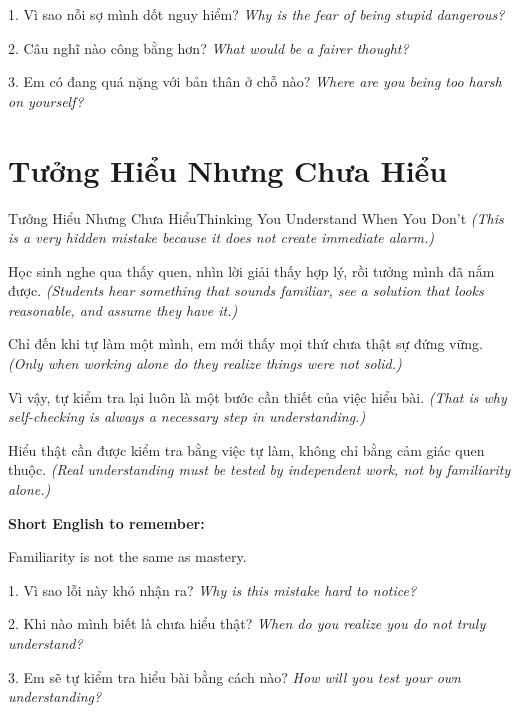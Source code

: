 \begin{tuhocnhanh}
1. Vì sao nỗi sợ mình dốt nguy hiểm? \textit{Why is the fear of being stupid dangerous?}

2. Câu nghĩ nào công bằng hơn? \textit{What would be a fairer thought?}

3. Em có đang quá nặng với bản thân ở chỗ nào? \textit{Where are you being too harsh on yourself?}
\end{tuhocnhanh}
\ngancach

\section{Tưởng Hiểu Nhưng Chưa Hiểu}
\begin{truyen}{Tưởng Hiểu Nhưng Chưa Hiểu}{Thinking You Understand When You Don't}
\textit{(This is a very hidden mistake because it does not create immediate alarm.)}

Học sinh nghe qua thấy quen, nhìn lời giải thấy hợp lý, rồi tưởng mình đã nắm được.
\textit{(Students hear something that sounds familiar, see a solution that looks reasonable, and assume they have it.)}

Chỉ đến khi tự làm một mình, em mới thấy mọi thứ chưa thật sự đứng vững.
\textit{(Only when working alone do they realize things were not solid.)}

Vì vậy, tự kiểm tra lại luôn là một bước cần thiết của việc hiểu bài.
\textit{(That is why self-checking is always a necessary step in understanding.)}
\end{truyen}

\begin{baihoc}
Hiểu thật cần được kiểm tra bằng việc tự làm, không chỉ bằng cảm giác quen thuộc.
\textit{(Real understanding must be tested by independent work, not by familiarity alone.)}
\end{baihoc}

\begin{ghinhoanh}
\textbf{Short English to remember:}

Familiarity is not the same as mastery.

\end{ghinhoanh}

\begin{tuhocnhanh}
1. Vì sao lỗi này khó nhận ra? \textit{Why is this mistake hard to notice?}

2. Khi nào mình biết là chưa hiểu thật? \textit{When do you realize you do not truly understand?}

3. Em sẽ tự kiểm tra hiểu bài bằng cách nào? \textit{How will you test your own understanding?}
\end{tuhocnhanh}
\ngancach